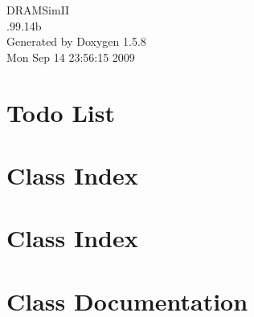 \documentclass[a4paper]{book}
\begin{document}
\begin{titlepage}
\vspace*{7cm}
\begin{center}
{\Large DRAMSimII \\[1ex]\large .99.14b }\\
\vspace*{1cm}
{\large Generated by Doxygen 1.5.8}\\
\vspace*{0.5cm}
{\small Mon Sep 14 23:56:15 2009}\\
\end{center}
\end{titlepage}
\clearemptydoublepage
{}
\tableofcontents
\clearemptydoublepage
{}
\chapter{Todo List}
\label{todo}

\chapter{Class Index}

\chapter{Class Index}

\chapter{Class Documentation}





















\printindex
\end{document}
